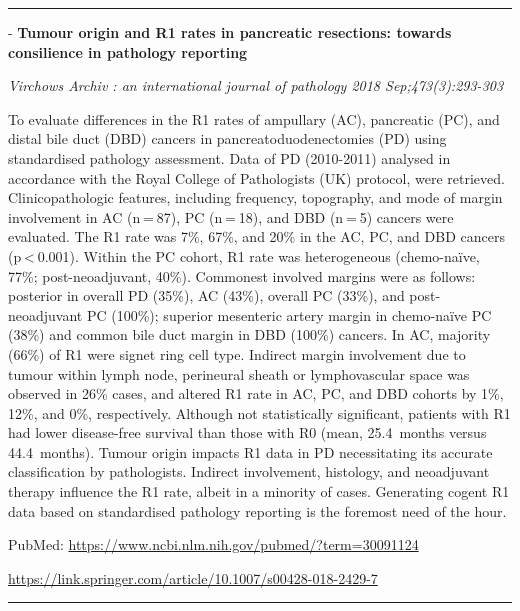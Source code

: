 \documentclass[]{article}
\begin{document}
{}

{}

\begin{center}\rule{0.5\linewidth}{\linethickness}\end{center}

 - \textbf{Tumour origin and R1 rates in pancreatic resections: towards
consilience in pathology reporting}

\emph{Virchows Archiv : an international journal of pathology 2018
Sep;473(3):293-303}

To evaluate differences in the R1 rates of ampullary (AC), pancreatic
(PC), and distal bile duct (DBD) cancers in pancreatoduodenectomies (PD)
using standardised pathology assessment. Data of PD (2010-2011) analysed
in accordance with the Royal College of Pathologists (UK) protocol, were
retrieved. Clinicopathologic features, including frequency, topography,
and mode of margin involvement in AC (n = 87), PC (n = 18), and DBD
(n = 5) cancers were evaluated. The R1 rate was 7\%, 67\%, and 20\% in
the AC, PC, and DBD cancers (p \textless{} 0.001). Within the PC cohort,
R1 rate was heterogeneous (chemo-naïve, 77\%; post-neoadjuvant, 40\%).
Commonest involved margins were as follows: posterior in overall PD
(35\%), AC (43\%), overall PC (33\%), and post-neoadjuvant PC (100\%);
superior mesenteric artery margin in chemo-naïve PC (38\%) and common
bile duct margin in DBD (100\%) cancers. In AC, majority (66\%) of R1
were signet ring cell type. Indirect margin involvement due to tumour
within lymph node, perineural sheath or lymphovascular space was
observed in 26\% cases, and altered R1 rate in AC, PC, and DBD cohorts
by 1\%, 12\%, and 0\%, respectively. Although not statistically
significant, patients with R1 had lower disease-free survival than those
with R0 (mean, 25.4~months versus 44.4~months). Tumour origin impacts R1
data in PD necessitating its accurate classification by pathologists.
Indirect involvement, histology, and neoadjuvant therapy influence the
R1 rate, albeit in a minority of cases. Generating cogent R1 data based
on standardised pathology reporting is the foremost need of the hour.

PubMed: \url{https://www.ncbi.nlm.nih.gov/pubmed/?term=30091124}

\url{https://link.springer.com/article/10.1007/s00428-018-2429-7}

{}

{}

\begin{center}\rule{0.5\linewidth}{\linethickness}\end{center}
\end{document}
